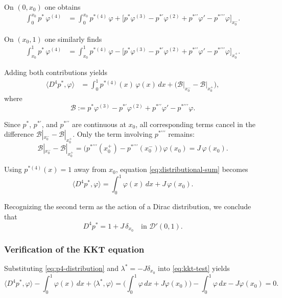\documentclass[11pt,a4paper]{article}
\begin{document}
On $(0,x_0)$ one obtains
\begin{align*}
\int_0^{x_0} p^*\,\varphi^{(4)}
&=
\int_0^{x_0} p^{*(4)}\,\varphi
+
\Big[
p^*\varphi^{(3)}
- p^{*\prime}\varphi^{(2)}
+ p^{*\prime\prime}\varphi'
- p^{*\prime\prime\prime}\varphi
\Big]_{x_0^-}.
\end{align*}

On $(x_0,1)$ one similarly finds
\begin{align*}
\int_{x_0}^{1} p^*\,\varphi^{(4)}
&=
\int_{x_0}^{1} p^{*(4)}\,\varphi
-
\Big[
p^*\varphi^{(3)}
- p^{*\prime}\varphi^{(2)}
+ p^{*\prime\prime}\varphi'
- p^{*\prime\prime\prime}\varphi
\Big]_{x_0^+}.
\end{align*}

Adding both contributions yields
\begin{align}
\langle D^4 p^*, \varphi \rangle
&=
\int_0^1 p^{*(4)}(x)\,\varphi(x)\,dx
+
\Big(
\mathcal B\big|_{x_0^-}
-
\mathcal B\big|_{x_0^+}
\Big),
\label{eq:distributional-sum}
\end{align}
where
\[
\mathcal B :=
p^*\varphi^{(3)}
- p^{*\prime}\varphi^{(2)}
+ p^{*\prime\prime}\varphi'
- p^{*\prime\prime\prime}\varphi.
\]

Since $p^*$, $p^{*\prime}$, and $p^{*\prime\prime}$ are continuous at $x_0$,
all corresponding terms cancel in the difference
$\mathcal B|_{x_0^-}-\mathcal B|_{x_0^+}$.
Only the term involving $p^{*\prime\prime\prime}$ remains:
\[
\mathcal B|_{x_0^-}-\mathcal B|_{x_0^+}
=
\big(p^{*\prime\prime\prime}(x_0^+) - p^{*\prime\prime\prime}(x_0^-)\big)\,
\varphi(x_0)
=
J\,\varphi(x_0).
\]

Using $p^{*(4)}(x)=1$ away from $x_0$, equation \eqref{eq:distributional-sum}
becomes
\[
\langle D^4 p^*, \varphi \rangle
=
\int_0^1 \varphi(x)\,dx
+
J\,\varphi(x_0).
\]

Recognizing the second term as the action of a Dirac distribution, we conclude
that
\begin{equation}
D^4 p^* = 1 + J\,\delta_{x_0}
\quad \text{in } \mathcal D'(0,1).
\label{eq:p4-distribution}
\end{equation}

\subsubsection*{Verification of the KKT equation}

Substituting \eqref{eq:p4-distribution} and $\lambda^*=-J\delta_{x_0}$ into
\eqref{eq:kkt-test} yields
\[
\langle D^4 p^*, \varphi \rangle
-
\int_0^1 \varphi(x)\,dx
+
\langle \lambda^*, \varphi \rangle
=
\bigg(\int_0^1 \varphi\,dx + J\varphi(x_0)\bigg)
-
\int_0^1 \varphi\,dx
-
J\varphi(x_0)
=0.
\]
\end{document}
